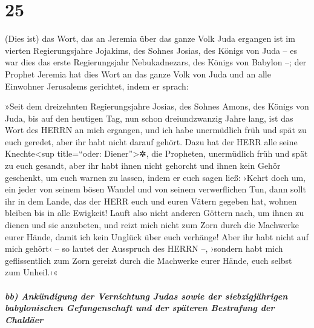\hypertarget{section-24}{%
\section{25}\label{section-24}}

(Dies ist) das Wort, das an Jeremia über das ganze Volk
Juda ergangen ist im vierten Regierungsjahre Jojakims, des Sohnes
Josias, des Königs von Juda -- es war dies das erste Regierungsjahr
Nebukadnezars, des Königs von Babylon --; der Prophet
Jeremia hat dies Wort an das ganze Volk von Juda und an alle Einwohner
Jerusalems gerichtet, indem er sprach:

»Seit dem dreizehnten Regierungsjahre Josias, des Sohnes
Amons, des Königs von Juda, bis auf den heutigen Tag, nun schon
dreiundzwanzig Jahre lang, ist das Wort des HERRN an mich ergangen, und
ich habe unermüdlich früh und spät zu euch geredet, aber ihr habt nicht
darauf gehört. Dazu hat der HERR alle seine
Knechte\textless sup title=``oder: Diener''\textgreater✲, die Propheten,
unermüdlich früh und spät zu euch gesandt, aber ihr habt ihnen nicht
gehorcht und ihnen kein Gehör geschenkt, um euch warnen zu lassen,
indem er euch sagen ließ: ›Kehrt doch um, ein jeder von
seinem bösen Wandel und von seinem verwerflichen Tun, dann sollt ihr in
dem Lande, das der HERR euch und euren Vätern gegeben hat, wohnen
bleiben bis in alle Ewigkeit! Lauft also nicht anderen
Göttern nach, um ihnen zu dienen und sie anzubeten, und reizt mich nicht
zum Zorn durch die Machwerke eurer Hände, damit ich kein Unglück über
euch verhänge! Aber ihr habt nicht auf mich gehört‹ -- so
lautet der Ausspruch des HERRN --, ›sondern habt mich geflissentlich zum
Zorn gereizt durch die Machwerke eurer Hände, euch selbst zum Unheil.‹«

\hypertarget{bb-ankuxfcndigung-der-vernichtung-judas-sowie-der-siebzigjuxe4hrigen-babylonischen-gefangenschaft-und-der-spuxe4teren-bestrafung-der-chalduxe4er}{%
\subparagraph{bb) Ankündigung der Vernichtung Judas sowie der
siebzigjährigen babylonischen Gefangenschaft und der späteren Bestrafung
der
Chaldäer}\label{bb-ankuxfcndigung-der-vernichtung-judas-sowie-der-siebzigjuxe4hrigen-babylonischen-gefangenschaft-und-der-spuxe4teren-bestrafung-der-chalduxe4er}}

